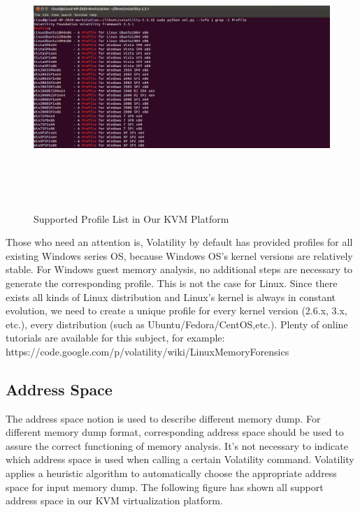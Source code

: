\begin{figure}[htbp]
	\centering
		\includegraphics[width=14cm, height= 10cm ]{Figures/Figure27.png}
	\caption[Supported Profile List in Our KVM Platform]{Supported Profile List in Our KVM Platform}
	\label{fig:Supported Profile List in Our KVM Platform}
\end{figure}

Those who need an attention is, Volatility by default has provided profiles for all existing Windows series OS, 
because Windows OS’s kernel versions are relatively stable. For Windows guest memory analysis, no additional steps are necessary to 
generate the corresponding profile. This is not the case for Linux. Since there exists all kinds of Linux distribution and Linux’s 
kernel is always in constant evolution, we need to create a unique profile for every kernel version (2.6.x, 3.x, etc.), every 
distribution (such as Ubuntu/Fedora/CentOS,etc.). Plenty of online tutorials are available for this subject, for example: 
https://code.google.com/p/volatility/wiki/LinuxMemoryForensics

\subsection{Address Space}
The address space notion is used to describe different memory dump. 
For different memory dump format, corresponding address space should be used to assure the correct functioning of memory analysis. 
It’s not necessary to indicate which address space is used when calling a certain Volatility command. 
Volatility applies a heuristic algorithm to automatically choose the appropriate address space for input memory dump. 
The following figure has shown all support address space in our KVM virtualization platform.

